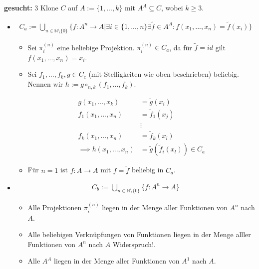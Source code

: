 \documentclass[]{article}
\begin{document}
\noindent
\textbf{gesucht:} 3 Klone $C$ auf $A:=\{1, ..., k\}$ mit $A^A\subseteq C$, wobei $k\geq 3$.

\begin{itemize}
	\item 
	
\begin{align*}
	C_a := \bigcup_{n\in\mathbb{N}\setminus\{0\}} \{f:A^n\rightarrow A \vert \exists i \in \{1, ..., n\}\exists \tilde{f}\in A^A : f(x_1, ..., x_n) = \tilde{f}(x_i)\}
\end{align*}

\begin{itemize}
	\item Sei $\pi_i^{(n)}$ eine beliebige Projektion. $\pi_i^{(n)} \in C_a$, da für $\tilde{f} = id$ gilt $f(x_1, ..., x_n) = x_i$.
	
	\item Sei $f_1,...,f_k,g \in C_c$ (mit Stelligkeiten wie oben beschrieben) beliebig. Nennen wir $h:=g\circ_{n,k}(f_1,...,f_k)$.
	
	\begin{align*}
		g(x_1, ..., x_k) &= \tilde{g}(x_i)\\
		f_1(x_1, ..., x_n) &= \tilde{f}_1(x_j)\\
		&\vdots\\
		f_k(x_1, ..., x_n) &= \tilde{f}_k(x_l)\\
		\implies h(x_1, ..., x_n) &= \tilde{g}(\tilde{f}_i(x_l)) \in C_a
	\end{align*}

	\item Für $n=1$ ist $f:A\rightarrow A$ mit $f=\tilde{f}$ beliebig in $C_a$.
\end{itemize}
	
	\item 
	
\begin{align*}
	C_b := \bigcup_{n\in\mathbb{N}\setminus\{0\}} \{f: A^n \rightarrow A\}
\end{align*}

\begin{itemize}
	\item Alle Projektionen $\pi_i^{(n)}$ liegen in der Menge aller Funktionen von $A^n$ nach $A$.
	
	\item Alle beliebigen Verknüpfungen von Funktionen liegen in der Menge alller Funktionen von $A^n$ nach $A\text{ Widerspruch!}$.
	
	\item Alle $A^A$ liegen in der Menge aller Funktionen von $A^1$ nach $A$.
\end{itemize}
	

\end{itemize}
\end{document}
